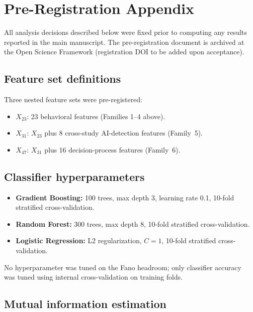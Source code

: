 \documentclass[11pt,a4paper]{article}
\renewcommand{\_}{\oldunderscore\allowbreak}
\begin{document}
\section{Pre-Registration Appendix}
\label{sec:note3}

All analysis decisions described below were fixed prior to computing
any results reported in the main manuscript. The pre-registration
document is archived at the Open Science Framework (registration DOI
to be added upon acceptance).

\subsection{Feature set definitions}

Three nested feature sets were pre-registered:

\begin{itemize}
  \item $X_{23}$: 23 behavioral features (Families 1--4 above).
  \item $X_{31}$: $X_{23}$ plus 8 cross-study AI-detection features
        (Family~5).
  \item $X_{47}$: $X_{31}$ plus 16 decision-process features
        (Family~6).
\end{itemize}

\subsection{Classifier hyperparameters}

\begin{itemize}
  \item \textbf{Gradient Boosting:} 100 trees, max depth 3, learning rate 0.1,
        10-fold stratified cross-validation.
  \item \textbf{Random Forest:} 300 trees, max depth 8, 10-fold stratified
        cross-validation.
  \item \textbf{Logistic Regression:} L2 regularization, $C = 1$, 10-fold
        stratified cross-validation.
\end{itemize}

No hyperparameter was tuned on the Fano headroom; only classifier
accuracy was tuned using internal cross-validation on training folds.

\subsection{Mutual information estimation}
\end{document}
